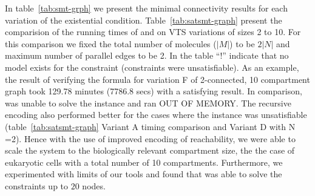 


In table~\ref{tab:smt-grph} we present the minimal connectivity results for each variation of the existential condition. 
%
Table~\ref{tab:satsmt-graph} present the comparision of the running times of {\smttool} and {\sattool} on VTS variations of sizes 2 to 10.
%
For this comparison we fixed the total number of molecules ($|M|$) to be $2|N|$ 
%
and maximum number of parallel
edges to be 2.
%
%
In the table ``!'' indicate that no model exists for the constraint  (constraints were unsatisfiable).
%
%
As an example, the result of verifying the formula for variation F of 2-connected, 10 compartment graph took 129.78 minutes (7786.8 secs) with a satisfying result.
%
In comparison, {\sattool} was unable to solve the instance and ran OUT OF MEMORY.
%
% 
The recursive encoding also performed better for the cases where the instance was unsatisfiable (table~\ref{tab:satsmt-graph} Variant A timing comparison and Variant D with N =2).
%
Hence with the use of improved encoding of reachability, we were able to scale the system to the biologically relevant compartment size, the
the case of eukaryotic cells with a total number of 10 compartments.
%
Furthermore, we experimented with limits of our tools and found that {\smttool} was able to solve the constraints up to $20$ nodes.

